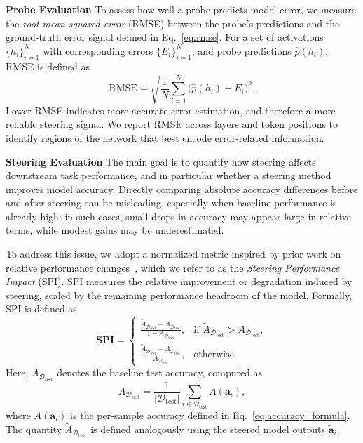 \documentclass[sigconf]{acmart}
\begin{document}
\textbf{Probe Evaluation}
To assess how well a probe predicts model error, we measure the \emph{root mean squared error} (RMSE) between the probe’s predictions and the ground-truth error signal defined in Eq.~\eqref{eq:rmse}. For a set of activations $\{h_i\}_{i=1}^N$ with corresponding errors $\{E_i\}_{i=1}^N$, and probe predictions $\hat{p}(h_i)$, RMSE is defined as
\begin{equation}
\mathrm{RMSE} = \sqrt{\frac{1}{N} \sum_{i=1}^{N} \bigl(\hat{p}(h_i) - E_i\bigr)^2}.
\label{eq:rmse}
\end{equation}
Lower RMSE indicates more accurate error estimation, and therefore a more reliable steering signal. We report RMSE across layers and token positions to identify regions of the network that best encode error-related information.

\textbf{Steering Evaluation}
The main goal is to quantify how steering affects downstream task performance, and in particular whether a steering method improves model accuracy. Directly comparing absolute accuracy differences before and after steering can be misleading, especially when baseline performance is already high: in such cases, small drops in accuracy may appear large in relative terms, while modest gains may be underestimated.

To address this issue, we adopt a normalized metric inspired by prior work on relative performance changes~\citep{burns2023weaktostronggeneralizationelicitingstrong}, which we refer to as the \emph{Steering Performance Impact} (SPI). SPI measures the relative improvement or degradation induced by steering, scaled by the remaining performance headroom of the model. Formally, SPI is defined as
\begin{equation} \label{eq:spi}
\mathbf{SPI} =
\begin{cases}
\displaystyle
\frac{\tilde{A}_{\mathcal{D}_{\text{test}}} - A_{\mathcal{D}_{\text{test}}}}{1 - A_{\mathcal{D}_{\text{test}}}},
& \text{if } \tilde{A}_{\mathcal{D}_{\text{test}}} > A_{\mathcal{D}_{\text{test}}}, \\[10pt]
\displaystyle
\frac{\tilde{A}_{\mathcal{D}_{\text{test}}} - A_{\mathcal{D}_{\text{test}}}}{A_{\mathcal{D}_{\text{test}}}},
& \text{otherwise}.
\end{cases}
\end{equation}
Here, $A_{\mathcal{D}_{\text{test}}}$ denotes the baseline test accuracy, computed as
\begin{equation}
A_{\mathcal{D}_{\text{test}}} = \frac{1}{|\mathcal{D}_{\text{test}}|}
\sum_{i \in \mathcal{D}_{\text{test}}} A(\mathbf{a}_i),
\label{eq:accuracy_formula}
\end{equation}
where $A(\mathbf{a}_i)$ is the per-sample accuracy defined in Eq.~\eqref{eq:accuracy_formula}. The quantity $\tilde{A}_{\mathcal{D}_{\text{test}}}$ is defined analogously using the steered model outputs $\tilde{\mathbf{a}}_i$.
\end{document}
